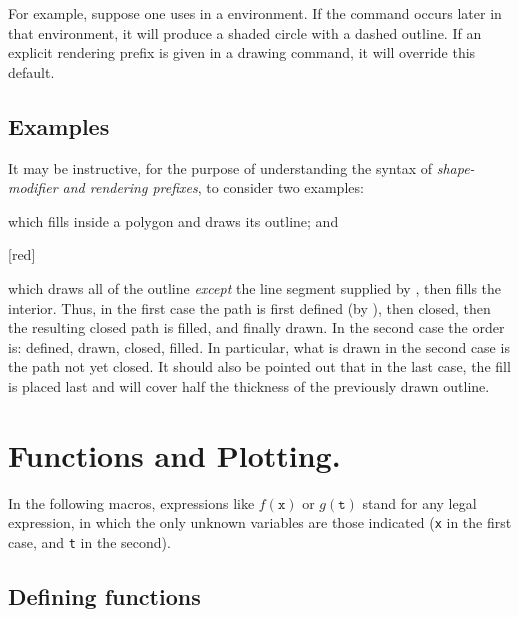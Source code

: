 \documentclass[letterpaper]{article}
\begin{document}
For example, suppose one uses 
in a  environment. If the command 
occurs later in that environment, it will produce a shaded circle with a
dashed outline. If an explicit rendering prefix is given in a drawing
command, it will override this default.


\subsection{Examples}\label{examples}

It may be instructive, for the purpose of understanding the syntax of
\emph{shape-modifier and rendering prefixes}, to consider two examples:
\begin{ex}
  \marg{$\ldots$}
\end{ex}
which fills inside a polygon and draws its outline; and
\begin{ex}
  [red]\marg{$\ldots$}
\end{ex}
which draws all of the outline \emph{except} the line segment supplied
by , then fills the interior. Thus, in the first case the
path is first defined (by ), then closed, then the resulting closed
path is filled, and finally drawn. In the second case the order is:
defined, drawn, closed, filled. In particular, what is drawn in the
second case is the path not yet closed. It should also be pointed out
that in the last case, the fill is placed last and will cover half
the thickness of the previously drawn outline.


\section{Functions and Plotting.}\label{functions}

In the following macros, expressions like $f(\mathtt{x})$ or $g(\mathtt{t})$
stand for any legal \MF{} expression, in which the only unknown
variables are those indicated (\texttt{x} in the first case, and \texttt{t} in
the second).


\subsection{Defining functions}\label{defining}

\begin{cd}
%
\end{cd}
\end{document}
